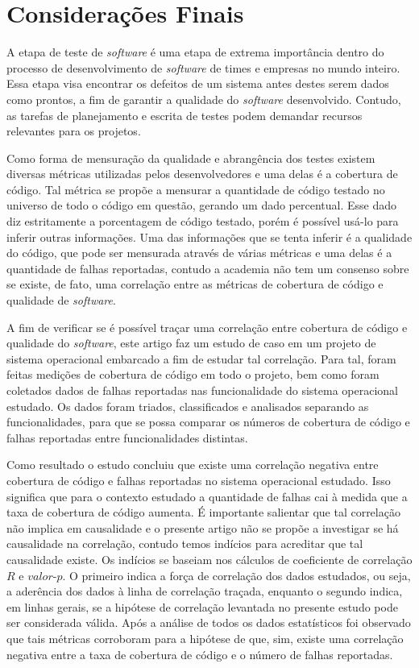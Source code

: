 \documentclass[11.5pt]{article}
\begin{document}
\section{Considerações Finais}

A etapa de teste de \textit{software} é uma etapa de extrema importância dentro do processo de
desenvolvimento de \textit{software} de times e empresas no mundo inteiro.
Essa etapa visa encontrar os defeitos de um sistema antes destes serem dados como prontos, a fim de
garantir a qualidade do \textit{software} desenvolvido.
Contudo, as tarefas de planejamento e escrita de testes podem demandar recursos relevantes para
os projetos.

Como forma de mensuração da qualidade e abrangência dos testes existem diversas métricas utilizadas
pelos desenvolvedores e uma delas é a cobertura de código.
Tal métrica se propõe a mensurar a quantidade de código testado no universo de todo o código em
questão, gerando um dado percentual.
Esse dado diz estritamente a porcentagem de código testado, porém é possível usá-lo para inferir
outras informações.
Uma das informações que se tenta inferir é a qualidade do código, que pode ser mensurada através de
várias métricas e uma delas é a quantidade de falhas reportadas, contudo a academia não tem um
consenso sobre se existe, de fato, uma correlação entre as métricas de cobertura de código e
qualidade de \textit{software}.

A fim de verificar se é possível traçar uma correlação entre cobertura de código e qualidade do
\textit{software}, este artigo faz um estudo de caso em um projeto de sistema operacional embarcado
a fim de estudar tal correlação.
Para tal, foram feitas medições de cobertura de código em todo o projeto, bem como foram coletados
dados de falhas reportadas nas funcionalidade do sistema operacional estudado.
Os dados foram triados, classificados e analisados separando as funcionalidades, para que se possa
comparar os números de cobertura de código e falhas reportadas entre funcionalidades distintas.

Como resultado o estudo concluiu que existe uma correlação negativa entre cobertura de código e
falhas reportadas no sistema operacional estudado.
Isso significa que para o contexto estudado a quantidade de falhas cai à medida que a taxa de
cobertura de código aumenta.
É importante salientar que tal correlação não implica em causalidade e o presente artigo não se
propõe a investigar se há causalidade na correlação, contudo temos indícios para acreditar que tal
causalidade existe.
Os indícios se baseiam nos cálculos de coeficiente de correlação $R$ e $valor\mbox{-}p$.
O primeiro indica a força de correlação dos dados estudados, ou seja, a aderência dos dados à linha
de correlação traçada, enquanto o segundo indica, em linhas gerais, se a hipótese de correlação
levantada no presente estudo pode ser considerada válida.
Após a análise de todos os dados estatísticos foi observado que tais métricas corroboram para a
hipótese de que, sim, existe uma correlação negativa entre a taxa de cobertura de código e o
número de falhas reportadas.
\end{document}
